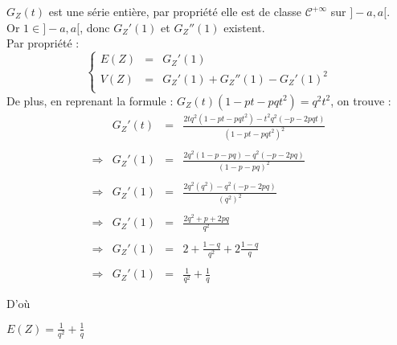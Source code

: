 $G_Z(t)$ est une série entière, par propriété elle est de classe $\mathcal{C}^{+\infty}$ sur $]-a, a[$.\\
        Or $1\in]-a, a[$, donc $G_Z'(1)$ et $G_Z''(1)$ existent.\\
Par propriété :
\[
  \left\{
  \begin{array}{rcl}
    E(Z) & = & G_Z'(1)                        \\
    V(Z) & = & G_Z'(1) + G_Z''(1) - G_Z'(1)^2 \\
  \end{array}
  \right.
\]
De plus, en reprenant la formule : $G_Z(t)(1-pt-pqt^2) = q^2t^2$, on trouve :
\[
  \begin{array}{rrcl}
                & G_Z'(t) & = & \frac{2tq^2(1-pt-pqt^2) - t^2q^2(-p-2pqt)}{(1-pt-pqt^2)^2} \\ \\
    \Rightarrow & G_Z'(1) & = & \frac{2q^2(1-p-pq) - q^2(-p-2pq)}{(1-p-pq)^2}              \\ \\
    \Rightarrow & G_Z'(1) & = & \frac{2q^2(q^2) - q^2(-p-2pq)}{(q^2)^2}                    \\ \\
    \Rightarrow & G_Z'(1) & = & \frac{2q^2 +p+2pq}{q^2}                                    \\ \\
    \Rightarrow & G_Z'(1) & = & 2 + \frac{1-q}{q^2}   + 2\frac{1-q}{q}                     \\ \\
    \Rightarrow & G_Z'(1) & = & \frac{1}{q^2}   + \frac{1}{q}                              \\ \\
  \end{array}
\]
D'où
\begin{result}
  $E(Z) = \frac{1}{q^2}   + \frac{1}{q}$
\end{result}
